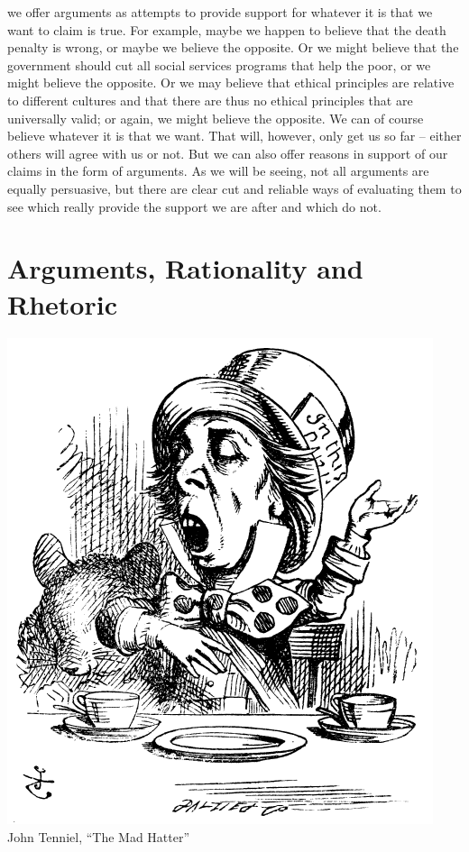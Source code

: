 \documentclass[justified]{tufte-book}
\begin{document}
 we offer arguments as attempts to provide support for whatever it is that we want to claim is true. For example, maybe we happen to believe that the death penalty is wrong, or maybe we believe the opposite. Or we might believe that the government should cut all social services programs that help the poor, or we might believe the opposite. Or we may believe that ethical principles are relative to different cultures and that there are thus no ethical principles that are universally valid; or again, we might believe the opposite. We can of course believe whatever it is that we want. That will, however, only get us so far -- either others will agree with us or not. But we can also offer reasons in support of our claims in the form of arguments. As we will be seeing, not all arguments are equally persuasive, but there are clear cut and reliable ways of evaluating them to see which really provide the support we are after and which do not.

\hypertarget{arguments-rationality-and-rhetoric}{%
\section{Arguments, Rationality and Rhetoric}\label{arguments-rationality-and-rhetoric}}

\begin{marginfigure}
\includegraphics{img/tenniel-hatter.png} John Tenniel, ``The Mad
Hatter''
\end{marginfigure}
\end{document}
